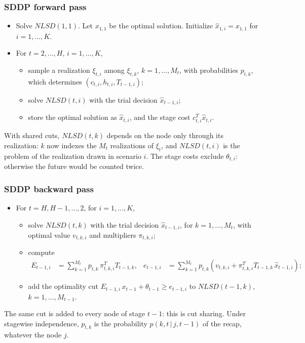 \documentclass[aspectratio=169]{beamer}
\begin{document}
\begin{frame}
\frametitle{SDDP forward pass}

\begin{itemize}
	\item
Solve $NLSD(1, 1)$. Let $x_{1,1}$ be the optimal solution.
Initialize $\hat{x}_{1,i} = x_{1,1}$ for $i = 1,\ldots,K$.
\item
For $t = 2,\ldots, H$, $i = 1,\ldots, K$,
\begin{itemize}
	\item
sample a realization $\xi_{t,i}$ among $\xi_{t,k}$, $k = 1,\ldots,M_t$, with probabilities
$p_{t,k}$, which determines $(c_{t,i}, h_{t,i}, T_{t-1,i})$;
\item
solve $NLSD(t, i)$ with the trial decision $\hat{x}_{t-1,i}$;
\item
store the optimal solution as $\hat{x}_{t,i}$, and the stage cost
$c_{t,i}^T\hat{x}_{t,i}$.
\end{itemize}
\end{itemize}

\mbox{}

With shared cuts, $NLSD(t,k)$ depends on the node only through its realization: $k$ now indexes the
$M_t$ realizations of $\xi_t$, and $NLSD(t,i)$ is the problem of the realization drawn in scenario $i$.
The stage costs exclude $\theta_{t,i}$: otherwise the future would be counted twice.

\end{frame}

\begin{frame}
	\frametitle{SDDP backward pass}

\begin{itemize}
	\item
For $t = H, H - 1,\ldots, 2$, for $i = 1,\ldots, K$,
\begin{itemize}
	\item
solve $NLSD(t, k)$ with the trial decision $\hat{x}_{t-1,i}$, for $k = 1,\ldots, M_t$, with
optimal value $v_{t,k,i}$ and multipliers $\pi_{t,k,i}$;
\item
compute
\begin{align*}
E_{t-1,i} &= \sum_{k = 1}^{M_t} p_{t,k}\, \pi_{t,k,i}^T T_{t-1,k}, &
e_{t-1,i} &= \sum_{k = 1}^{M_t} p_{t,k} \left( v_{t,k,i} + \pi_{t,k,i}^T T_{t-1,k}\, \hat{x}_{t-1,i} \right);
\end{align*}
\item
add the optimality cut
$
E_{t-1,i}\, x_{t-1} + \theta_{t-1} \geq e_{t-1,i}
$
to $NLSD(t - 1, k)$, $k = 1,\ldots, M_{t-1}$.
\end{itemize}
\end{itemize}
The same cut is added to every node of stage $t-1$: this is cut sharing. Under stagewise
independence, $p_{t,k}$ is the probability $p(k, t\,|\,j, t-1)$ of the recap, whatever the node $j$.

\end{frame}
\end{document}
